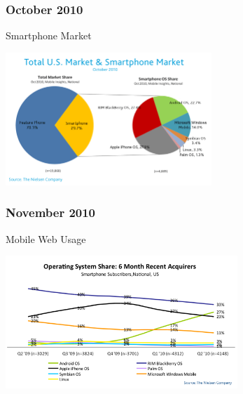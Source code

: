 \documentclass{beamer}
\begin{document}
\begin{frame}
 \frametitle{October 2010}

\begin{center}
\begin{large}
Smartphone Market
\end{large}

\hspace{0.2cm}
\includegraphics[height=5.0cm]{figs/mobile_web_usage2}
\hspace{0.2cm}
\end{center}

\end{frame}

\begin{frame}
 \frametitle{November 2010}

\begin{center}
\begin{large}
Mobile Web Usage
\end{large}

\hspace{0.2cm}
\includegraphics[height=5.0cm]{figs/mobile_web_usage3}
\hspace{0.2cm}
\end{center}

\end{frame}
\end{document}
